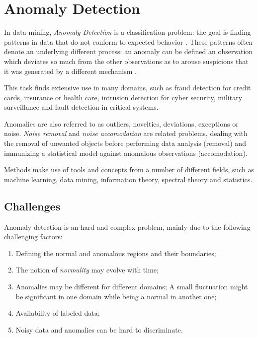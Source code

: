 \section{Anomaly Detection}

In data mining, \textit{Anomaly Detection} is a classification problem: the goal is finding patterns in data that do not conform to expected behavior \cite{chandola2009anomaly}. These patterns often denote an underlying different process: an anomaly can be defined an observation which deviates so much from the other observations as to arouse suspicions that it was generated by a different mechanism \cite{hawkins1980identification}.

This task finds extensive use in many domains, such as fraud detection for credit cards, insurance or health care, intrusion detection for cyber security, military surveillance and fault detection in critical systems.

Anomalies are also referred to as outliers, novelties, deviations, exceptions or noise. \textit{Noise removal} and \textit{noise accomodation} are related problems, dealing with the removal of unwanted objects before performing data analysis (removal) and immunizing a statistical model against anomalous observations (accomodation).

Methods make use of tools and concepts from a number of different fields, such as machine learning, data mining, information theory, spectral theory and statistics.

\subsection{Challenges}

Anomaly detection is an hard and complex problem, mainly due to the following challenging factors:

\begin{enumerate}
	\item Defining the normal and anomalous regions and their boundaries;
	\item The notion of \textit{normality} may evolve with time;
	\item Anomalies may be different for different domains; A small fluctuation might be significant in one domain while being a normal in another one;
	\item Availability of labeled data;
	\item Noisy data and anomalies can be hard to discriminate.
\end{enumerate}

